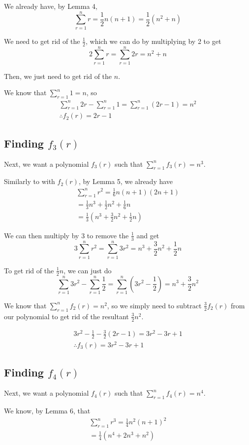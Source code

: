 \documentclass[a4paper]{article}
\newcommand{\sn}{\sum\limits_{r=1}^{n}}
\newcommand{\oo}[1]{\frac{1}{#1}}
\begin{document}
We already have, by Lemma 4, $$\sn r = \oo{2}n(n + 1) = \oo{2}\left(n^2 + n\right)$$

We need to get rid of the $\oo{2}$, which we can do by multiplying by 2 to get $$2 \sn r = \sn 2r = n^2 + n$$

Then, we just need to get rid of the $n$.

We know that $\sn 1 = n$, so
\begin{gather*}
\sn 2r - \sn 1 = \sn (2r - 1) = n^2\\
\therefore f_2(r) = 2r - 1
\end{gather*}

\subsection{Finding $f_3(r)$}

Next, we want a polynomial $f_3(r)$ such that $\sn f_3(r) = n^3$.

Similarly to with $f_2(r)$, by Lemma 5, we already have
\begin{gather*}
\sn r^2 = \oo{6}n(n + 1)(2n + 1)\\
= \oo{3}n^3 + \oo{2}n^2 + \oo{6}n\\[0.2em]
= \oo{3}\left(n^3 + \frac{3}{2}n^2 + \oo{2}n\right)
\end{gather*}

We can then multiply by $3$ to remove the $\oo{3}$ and get $$3 \sn r^2 = \sn 3r^2 = n^3 + \frac{3}{2}n^2 + \oo{2}n$$

To get rid of the $\oo{2}n$, we can just do $$\sn 3r^2 - \sn \oo{2} = \sn \left(3r^2 - \oo{2}\right) = n^3 + \frac{3}{2}n^2$$

We know that $\sn f_2(r) = n^2$, so we simply need to subtract $\frac{3}{2}f_2(r)$ from our polynomial to get rid of the resultant $\frac{3}{2}n^2$.

\begin{gather*}
3r^2 - \oo{2} - \frac{3}{2}(2r - 1) = 3r^2 - 3r + 1\\
\therefore f_3(r) = 3r^2 - 3r + 1
\end{gather*}

\subsection{Finding $f_4(r)$}

Next, we want a polynomial $f_4(r)$ such that $\sn f_4(r) = n^4$.

We know, by Lemma 6, that
\begin{gather*}
\sn r^3 = \oo{4}n^2(n + 1)^2\\
= \oo{4}\left(n^4 + 2n^3 + n^2\right)
\end{gather*}
\end{document}
